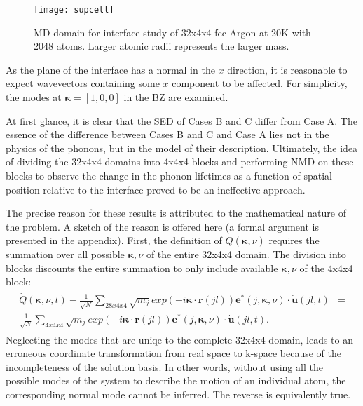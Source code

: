\begin{figure}[ht]
\centering
\texttt{[image: supcell]}
\caption{MD domain for interface study of 32x4x4 fcc Argon at 20K with 2048 atoms. Larger atomic radii represents the larger mass.}
\label{fig:subfig1}
\end{figure}
As the plane of the interface has a normal in the $x$ direction, it is reasonable to expect wavevectors containing some $x$ component to be affected. For simplicity, the modes at $\bm{\kappa}=[1,0,0]$ in the BZ are examined. 
\begin{figure}[h!]
\centering
{}
\end{figure}
At first glance, it is clear that the SED of Cases B and C differ from Case A. The essence of the difference between Cases B and C and Case A lies not in the physics of the phonons, but in the model of their description. Ultimately, the idea of dividing the 32x4x4 domains into 4x4x4 blocks and performing NMD on these blocks to observe the change in the phonon lifetimes as a function of spatial position relative to the interface proved to be an ineffective approach.

The precise reason for these results is attributed to the mathematical nature of the problem. A sketch of the reason is offered here (a formal argument is presented in the appendix). First, the definition of $Q(\bm{\kappa},\nu)$ requires the summation over all possible $\bm{\kappa},\nu$ of the entire 32x4x4 domain. The division into blocks discounts the entire summation to only include available $\bm{\kappa},\nu$ of the 4x4x4 block:
\begin{eqnarray}
\begin{split}
\dot{Q}(\bm{\kappa},\nu,t)-\frac{1}{\sqrt{N}}\sum_{28x4x4}\sqrt{m_j}exp(-i\bm{\kappa}\cdot\bm{r}(jl))\bm{e}^*(j,\bm{\kappa},\nu)\cdot\dot{\bm{u}}(jl,t)&=\\\frac{1}{\sqrt{N}}\sum_{4x4x4}\sqrt{m_j}exp(-i\bm{\kappa}\cdot\bm{r}(jl))\bm{e}^*(j,\bm{\kappa},\nu)\cdot\dot{\bm{u}}(jl,t).
\end{split}
\end{eqnarray}
Neglecting the modes that are uniqe to the complete 32x4x4 domain, leads to an erroneous coordinate transformation from real space to k-space because of the incompleteness of the solution basis. In other words, without using all the possible modes of the system to describe the motion of an individual atom, the corresponding normal mode cannot be inferred. The reverse is equivalently true.


